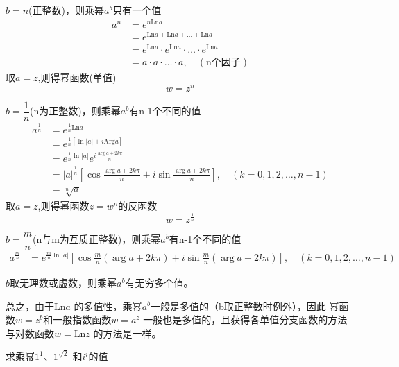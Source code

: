 \begin{compactenum}[(a)]
	\item $b=n$(正整数)，则乘幂$a^b$只有一个值 
  \[  \begin{aligned}
    a^n & = e^{n \text{Ln}a}  \\
    &= e^{ \text{Ln}a +  \text{Ln}a + \dots + \text{Ln}a }  \\
    &= e^{ \text{Ln}a} \cdot e^{ \text{Ln}a} \cdot \dots \cdot e^{ \text{Ln}a} \\
    & = a\cdot a \cdot \dots \cdot a, \quad (\text{n个因子}) 
  \end{aligned} \]
  取$a=z$,则得幂函数(单值) 
  \begin{equation}
    w = z^n 
  \end{equation}
	\item   $b=\dfrac{1}{n}$(n为正整数)，则乘幂$a^b$有n-1个不同的值
	\[  \begin{aligned}
    a^{\frac{1}{n}} & = e^{\frac{1}{n}\text{Ln}a}  \\
    &=  e^{\frac{1}{n} [\ln|a| + i \text{Arg}a] }\\ 
    & = e^{\frac{1}{n}\ln|a|} e^{i \frac{ \arg a + 2k \pi }{n}} \\
    & = |a|^{\frac{1}{n}} \left[ \cos \frac{ \arg a + 2k \pi }{n} + i \sin \frac{ \arg a + 2k \pi }{n}\right], \quad (k = 0,1,2,\dots, n-1) \\
    & = \sqrt[n]{a}
  \end{aligned} \]
  取$a=z$,则得幂函数$z = w^n $的反函数
  \begin{equation}
    w = z^{\frac{1}{n}} 
  \end{equation}
  \item   $b=\dfrac{m}{n}$(n与m为互质正整数)，则乘幂$a^b$有n-1个不同的值
	\[  \begin{aligned}
    a^{\frac{m}{n}} & = e^{\frac{m}{n} \ln |a|} \left[ \cos \frac{m}{n} (\arg a + 2k \pi ) + i \sin \frac{m}{n} (\arg a + 2k \pi ) \right], \quad (k = 0,1,2,\dots, n-1)
  \end{aligned} \]
  \item   $b$取无理数或虚数，则乘幂$a^b$有无穷多个值。\\
\end{compactenum}
总之，由于$\text{Ln} a $ 的多值性，乘幂$a^b$一般是多值的（b取正整数时例外），因此 幂函数$w = z^b$和一般指数函数$w = a^z$ 一般也是多值的，且获得各单值分支函数的方法与对数函数$w = \text{Ln} z $ 的方法是一样。  
  \begin{example}
  求乘幂$1^1$、$1^{\sqrt{2}}$ 和$i^i$的值 
\end{example}
